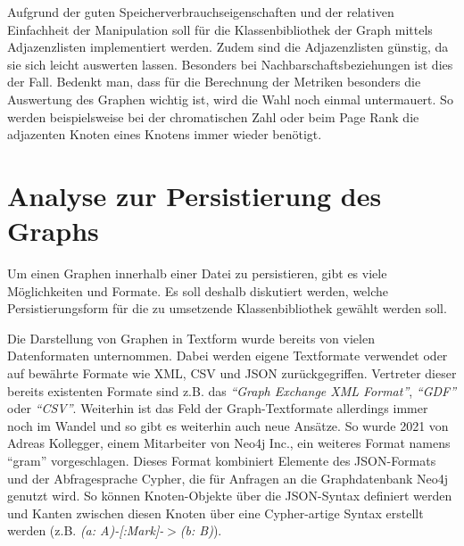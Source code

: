 \documentclass[a4paper,12pt,ngerman,chapterprefix=false,listof=totoc,bibliography=totoc]{scrreprt}
\begin{document}
{{{Aufgrund der guten Speicherverbrauchseigenschaften und der relativen Einfachheit der Manipulation soll für die Klassenbibliothek der Graph mittels Adjazenzlisten implementiert werden. Zudem sind die Adjazenzlisten günstig, da sie sich leicht auswerten lassen. Besonders bei Nachbarschaftsbeziehungen ist dies der Fall. Bedenkt man, dass für die Berechnung der Metriken besonders die Auswertung des Graphen wichtig ist, wird die Wahl noch einmal untermauert. So werden beispielsweise bei der chromatischen Zahl oder beim Page Rank die adjazenten Knoten eines Knotens immer wieder benötigt.
}

\section{Analyse zur Persistierung des Graphs}
{
Um einen Graphen innerhalb einer Datei zu persistieren, gibt es viele Möglichkeiten und Formate. Es soll deshalb diskutiert werden, welche Persistierungsform für die zu umsetzende Klassenbibliothek gewählt werden soll.

Die Darstellung von Graphen in Textform wurde bereits von vielen Datenformaten unternommen. Dabei werden eigene Textformate verwendet oder auf bewährte Formate wie XML, CSV und JSON zurückgegriffen. Vertreter dieser bereits existenten Formate sind z.B. das \textit{"`Graph Exchange XML Format"'}, \textit{"`GDF"'} oder \textit{"`CSV"'}. \cite{gephi_supported_2017} Weiterhin ist das Feld der Graph-Textformate allerdings immer noch im Wandel und so gibt es weiterhin auch neue Ansätze. So wurde 2021 von Adreas Kollegger, einem Mitarbeiter von Neo4j Inc., ein weiteres Format namens "`gram"' vorgeschlagen. Dieses Format kombiniert Elemente des JSON-Formats und der Abfragesprache Cypher, die für Anfragen an die Graphdatenbank Neo4j genutzt wird. So können Knoten-Objekte über die JSON-Syntax definiert werden und Kanten zwischen diesen Knoten über eine Cypher-artige Syntax erstellt werden (z.B. \textit{(a: A)-[:Mark]-\(>\)(b: B)}). \cite{kollegger_gram_2021}

}}}
\end{document}
